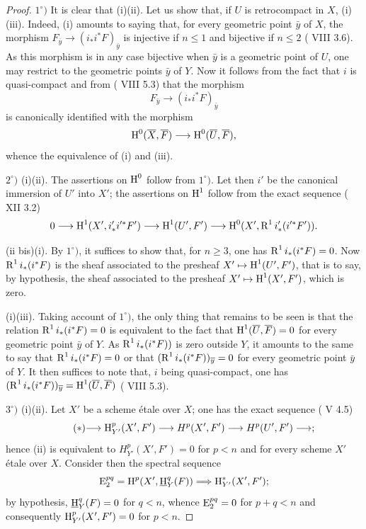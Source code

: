 \begin{proof}
$1^\circ)$ It is clear that \textup{(i)}\SSI \textup{(ii)}.
Let us show that, if $U$ is retrocompact in $X$, \textup{(i)}\SSI
\textup{(iii)}. Indeed, \textup{(i)} amounts to saying that, for
every geometric point $\bar{y}$ of $X$, the morphism
$F_{\bar{y}}\to (i_*i^*F)_{\bar{y}}$ is injective if $n\leq 1$ and
bijective if $n\leq 2$ ( VIII 3.6). As this morphism is in
any case bijective when $\bar{y}$ is a geometric
point of $U$, one may restrict to the geometric points
$\bar{y}$ of $Y$. Now it follows from the fact that $i$ is quasi-compact
and from ( VIII 5.3) that the morphism
$$F_{\bar{y}}\to (i_*i^*F)_{\bar{y}}$$
is canonically identified with the morphism
$$
\H^0(\bar{X}, \bar{F})\to \H^0(\bar{U}, \bar{F}),
$$
whence the equivalence of \textup{(i)} and \textup{(iii)}.

$2^\circ)$ \textup{(i)}\ALORS \textup{(ii)}. The assertions on $\operatorname{H}^0$ follow from $1^\circ)$. Let then $i'$ be the canonical immersion of $U'$ into $X'$; the assertions on $\operatorname{H}^1$ follow from the exact sequence ( XII 3.2)
$$0\to \H^1(X', i'_*i'^*F')\to \H^1(U', F')\to \H^0(X', \R^1i'_*(i'^*F')).
$$

(ii bis)\ALORS \textup{(i)}. By $1^\circ)$, it suffices to show that, for $n\geq 3$, one has $\operatorname{R}^1i_*(i^*F)=0$. Now $\operatorname{R}^1i_*(i^*F)$ is the sheaf associated to the presheaf $X'\mto \H^1(U', F')$, that is to say, by hypothesis, the sheaf associated to the presheaf $X'\mto \H^1(X', F')$, which is zero.

\textup{(i)}\SSI \textup{(iii)}. Taking account of $1^\circ)$, the only thing that remains to be seen is that the relation $\operatorname{R}^1i_*(i^*F)=0$ is equivalent to the fact that $\operatorname{H}^1(\overline U, \overline F)=0$ for every geometric point $\bar y$ of $Y$. As $\operatorname{R}^1i_*(i^*F))$ is zero outside $Y$, it amounts to the same to say that $\operatorname{R}^1i_*(i^*F)=0$ or that $(\operatorname{R}^1i_*(i^*F))_{\overline y}=0$ for every geometric point $\bar y$ of $Y$. It then suffices to note that, $i$ being quasi-compact, one has $(\operatorname{R}^1i_*(i^*F))_{\overline y}=\operatorname{H}^1(\overline U, \overline F)$ ( VIII 5.3).

$3^\circ)$ \textup{(i)}\ALORS \textup{(ii)}. Let $X'$ be a scheme \'etale over $X$; one has the exact sequence ( V 4.5)
\begin{equation*} \label{eq:XIV.1.1.*} \tag{$*$} {\to \H^p_{Y'}(X', F')\to H^p(X', F')\to H^p(U', F')\to};
\end{equation*}
hence \textup{(ii)} is equivalent to $H^p_{Y'}(X', F')=0$ for $p<n$ and for every scheme $X'$ \'etale over $X$. Consider then the spectral sequence
$$
\E_2^{pq}=\H^p(X', {\h}_Y^q(F))\To \H_{Y'}^*(X', F');$$
by hypothesis, ${\operatorname{\underline{H}}}_Y^q(F)=0$ for $q<n$, whence $\operatorname{E}_2^{pq}=0$ for $p+q<n$ and consequently $\operatorname{H}_{Y'}^p(X', F')=0$ for $p<n$.


\end{proof}
